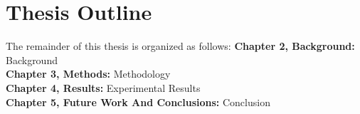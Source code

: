 \section[Outline]{Thesis Outline}
The remainder of this thesis is organized as follows:
\noindent\textbf{Chapter 2, Background:} Background\\
\noindent\textbf{Chapter 3, Methods:} Methodology\\
\noindent\textbf{Chapter 4, Results:} Experimental Results\\
\noindent\textbf{Chapter 5, Future Work And Conclusions:} Conclusion